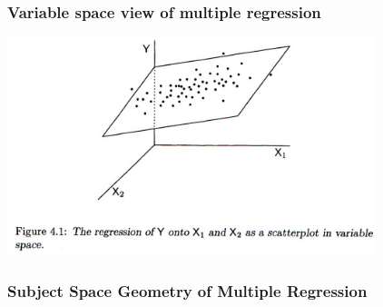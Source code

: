 \documentclass{beamer}
\begin{document}
\begin{frame}[fragile]
  \frametitle{Variable space view of multiple regression}

\begin{center}
\includegraphics[height=2.5in]{regression-variable-space}
\end{center}


\end{frame}


\begin{frame}
  \frametitle{Subject Space Geometry of Multiple Regression}

\begin{center}

\end{center}
\end{frame}
\end{document}
